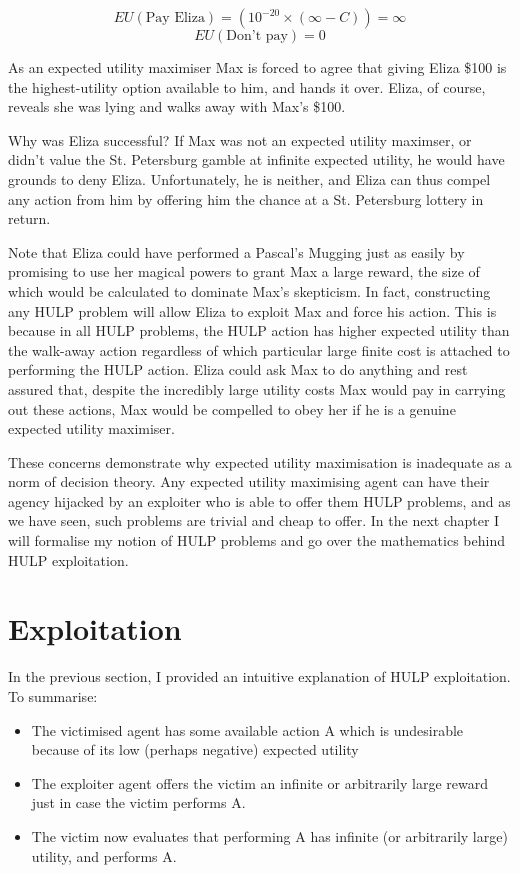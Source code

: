\documentclass{article}
\begin{document}
\[EU(\mbox{Pay Eliza})=(10^{-20}\times(\infty-C)) = \infty\]
\[EU(\mbox{Don't pay})=0\]

As an expected utility maximiser Max is forced to agree that giving Eliza \$100 is the highest-utility option available to him, and hands it over. Eliza, of course, reveals she was lying and walks away with Max's \$100.

Why was Eliza successful? If Max was not an expected utility maximser, or didn't value the St. Petersburg gamble at infinite expected utility, he would have grounds to deny Eliza. Unfortunately, he is neither, and Eliza can thus compel any action from him by offering him the chance at a St. Petersburg lottery in return. 

Note that Eliza could have performed a Pascal's Mugging just as easily by promising to use her magical powers to grant Max a large reward, the size of which would be calculated to dominate Max's skepticism. In fact, constructing any HULP problem will allow Eliza to exploit Max and force his action. This is because in all HULP problems, the HULP action has higher expected utility than the walk-away action regardless of which particular large finite cost is attached to performing the HULP action. Eliza could ask Max to do anything and rest assured that, despite the incredibly large utility costs Max would pay in carrying out these actions, Max would be compelled to obey her if he is a genuine expected utility maximiser.

These concerns demonstrate why expected utility maximisation is inadequate as a norm of decision theory. Any expected utility maximising agent can have their agency hijacked by an exploiter who is able to offer them HULP problems, and as we have seen, such problems are trivial and cheap to offer. In the next chapter I will formalise my notion of HULP problems and go over the mathematics behind HULP exploitation.

\section{Exploitation}

In the previous section, I provided an intuitive explanation of HULP exploitation. To summarise:

\begin{itemize}
\item The victimised agent has some available action A which is undesirable because of its low (perhaps negative) expected utility
\item The exploiter agent offers the victim an infinite or arbitrarily large reward just in case the victim performs A. 
\item The victim now evaluates that performing A has infinite (or arbitrarily large) utility, and performs A.
\end{itemize}
\end{document}
